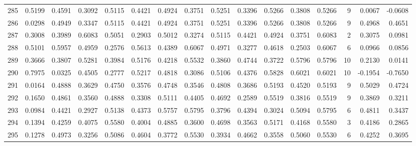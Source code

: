 \begin{tabular}{lrrrrrrrrrrrrrrr}
285 &      0.5199 &  0.4591 &  0.3092 &  0.5115 &  0.4421 &  0.4924 &  0.3751 &  0.5251 &  0.3396 &  0.5266 &   0.3808 &     0.5266 &      9 &                    0.0067 &                    -0.0608 \\
286 &      0.0298 &  0.4949 &  0.3347 &  0.5115 &  0.4421 &  0.4924 &  0.3751 &  0.5251 &  0.3396 &  0.5266 &   0.3808 &     0.5266 &      9 &                    0.4968 &                     0.4651 \\
287 &      0.3008 &  0.3989 &  0.6083 &  0.5051 &  0.2903 &  0.5012 &  0.3274 &  0.5115 &  0.4421 &  0.4924 &   0.3751 &     0.6083 &      2 &                    0.3075 &                     0.0981 \\
288 &      0.5101 &  0.5957 &  0.4959 &  0.2576 &  0.5613 &  0.4389 &  0.6067 &  0.4971 &  0.3277 &  0.4618 &   0.2503 &     0.6067 &      6 &                    0.0966 &                     0.0856 \\
289 &      0.3666 &  0.3807 &  0.5281 &  0.3984 &  0.5176 &  0.4218 &  0.5532 &  0.3860 &  0.4744 &  0.3722 &   0.5796 &     0.5796 &     10 &                    0.2130 &                     0.0141 \\
290 &      0.7975 &  0.0325 &  0.4505 &  0.2777 &  0.5217 &  0.4818 &  0.3086 &  0.5106 &  0.4376 &  0.5828 &   0.6021 &     0.6021 &     10 &                   -0.1954 &                    -0.7650 \\
291 &      0.0164 &  0.4888 &  0.3629 &  0.4750 &  0.3576 &  0.4748 &  0.3546 &  0.4808 &  0.3686 &  0.5193 &   0.4520 &     0.5193 &      9 &                    0.5029 &                     0.4724 \\
292 &      0.1650 &  0.4861 &  0.3560 &  0.4888 &  0.3308 &  0.5111 &  0.4405 &  0.4692 &  0.2589 &  0.5519 &   0.3816 &     0.5519 &      9 &                    0.3869 &                     0.3211 \\
293 &      0.0984 &  0.4421 &  0.2927 &  0.5138 &  0.4373 &  0.5757 &  0.5795 &  0.3796 &  0.4394 &  0.3024 &   0.5094 &     0.5795 &      6 &                    0.4811 &                     0.3437 \\
294 &      0.1394 &  0.4259 &  0.4075 &  0.5580 &  0.4004 &  0.4885 &  0.3600 &  0.4698 &  0.3563 &  0.5171 &   0.4168 &     0.5580 &      3 &                    0.4186 &                     0.2865 \\
295 &      0.1278 &  0.4973 &  0.3256 &  0.5086 &  0.4604 &  0.3772 &  0.5530 &  0.3934 &  0.4662 &  0.3558 &   0.5060 &     0.5530 &      6 &                    0.4252 &                     0.3695 \\

\end{tabular}
